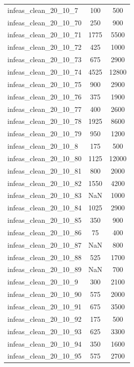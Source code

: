\begin{longtable}{lcc}
infeas\_clean\_20\_10\_7   &      100 &    500 \\
infeas\_clean\_20\_10\_70  &      250 &    900 \\
infeas\_clean\_20\_10\_71  &     1775 &   5500 \\
infeas\_clean\_20\_10\_72  &      425 &   1000 \\
infeas\_clean\_20\_10\_73  &      675 &   2900 \\
infeas\_clean\_20\_10\_74  &     4525 &  12800 \\
infeas\_clean\_20\_10\_75  &      900 &   2900 \\
infeas\_clean\_20\_10\_76  &      375 &   1900 \\
infeas\_clean\_20\_10\_77  &      400 &   2600 \\
infeas\_clean\_20\_10\_78  &     1925 &   8600 \\
infeas\_clean\_20\_10\_79  &      950 &   1200 \\
infeas\_clean\_20\_10\_8   &      175 &    500 \\
infeas\_clean\_20\_10\_80  &     1125 &  12000 \\
infeas\_clean\_20\_10\_81  &      800 &   2000 \\
infeas\_clean\_20\_10\_82  &     1550 &   4200 \\
infeas\_clean\_20\_10\_83  &      NaN &   1000 \\
infeas\_clean\_20\_10\_84  &     1025 &   2900 \\
infeas\_clean\_20\_10\_85  &      350 &    900 \\
infeas\_clean\_20\_10\_86  &       75 &    400 \\
infeas\_clean\_20\_10\_87  &      NaN &    800 \\
infeas\_clean\_20\_10\_88  &      525 &   1700 \\
infeas\_clean\_20\_10\_89  &      NaN &    700 \\
infeas\_clean\_20\_10\_9   &      300 &   2100 \\
infeas\_clean\_20\_10\_90  &      575 &   2000 \\
infeas\_clean\_20\_10\_91  &      675 &   3500 \\
infeas\_clean\_20\_10\_92  &      175 &    500 \\
infeas\_clean\_20\_10\_93  &      625 &   3300 \\
infeas\_clean\_20\_10\_94  &      350 &   1600 \\
infeas\_clean\_20\_10\_95  &      575 &   2700 \\

\end{longtable}
